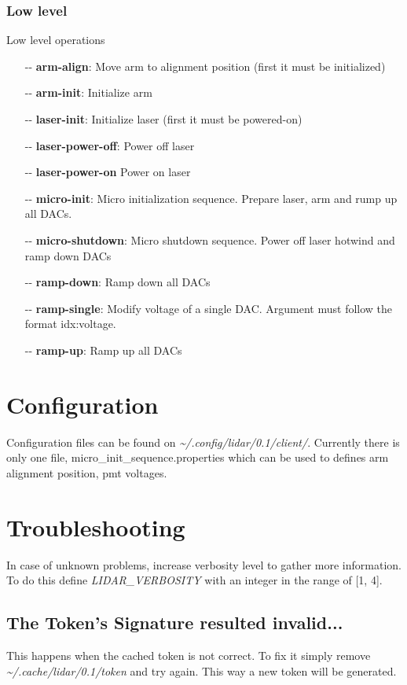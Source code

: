 \documentclass[letterpaper, 10 pt]{article}
\begin{document}
\subsubsection{Low level}
Low level operations
\begin{itemize}
	\item[-{}-] \textbf{arm-align}: Move arm to alignment position (first it must be initialized)
	\item[-{}-] \textbf{arm-init}: Initialize arm
	\item[-{}-] \textbf{laser-init}: Initialize laser (first it must be powered-on)
	\item[-{}-] \textbf{laser-power-off}: Power off laser
	\item[-{}-] \textbf{laser-power-on} Power on laser
	\item[-{}-] \textbf{micro-init}: Micro initialization sequence. Prepare laser, arm and rump up all DACs.
	\item[-{}-] \textbf{micro-shutdown}: Micro shutdown sequence. Power off laser hotwind and ramp down DACs
	\item[-{}-] \textbf{ramp-down}: Ramp down all DACs
	\item[-{}-] \textbf{ramp-single}: Modify voltage of a single DAC. Argument must follow the format idx:voltage.
	\item[-{}-] \textbf{ramp-up}: Ramp up all DACs
\end{itemize}

\section{Configuration}
Configuration files can be found on \textit{\~{}/.config/lidar/0.1/client/}. Currently there is only one file, micro\_init\_sequence.properties which can be used to defines arm alignment position, pmt voltages.

\section{Troubleshooting}
In case of unknown problems, increase verbosity level to gather more information. To do this define \emph{LIDAR\_VERBOSITY} with an integer in the range of [1, 4].
\subsection{The Token's Signature resulted invalid...}
This happens when the cached token is not correct. To fix it simply remove \textit{\~{}/.cache/lidar/0.1/token} and try again. This way a new token will be generated.\\
\end{document}
